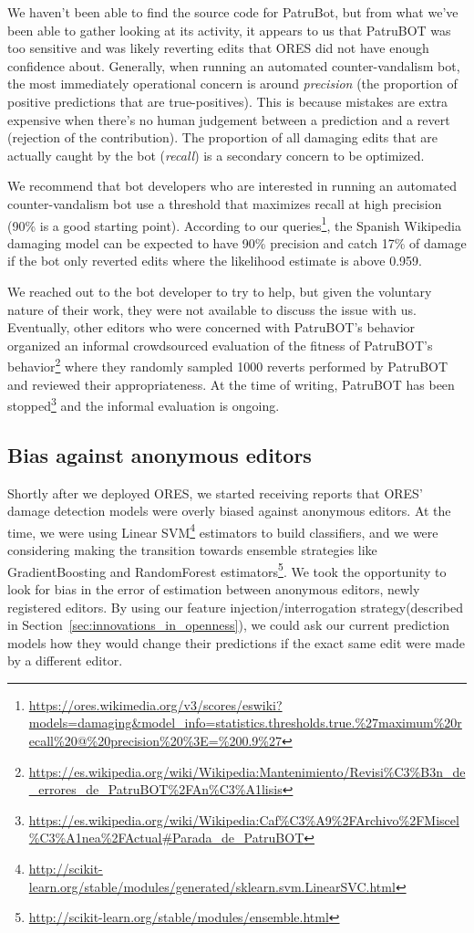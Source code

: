 We haven't been able to find the source code for PatruBot, but from what we've been able to gather looking at its activity, it appears to us that PatruBOT was too sensitive and was likely reverting edits that ORES did not have enough confidence about.  Generally, when running an automated counter-vandalism bot, the most immediately operational concern is around \emph{precision} (the proportion of positive predictions that are true-positives).  This is because mistakes are extra expensive when there's no human judgement between a prediction and a revert (rejection of the contribution).  The proportion of all damaging edits that are actually caught by the bot (\emph{recall}) is a secondary concern to be optimized.

We recommend that bot developers who are interested in running an automated counter-vandalism bot use a threshold that maximizes recall at high precision (90\% is a good starting point).  According to our queries\footnote{\url{https://ores.wikimedia.org/v3/scores/eswiki?models=damaging\&model\_info=statistics.thresholds.true.\%27maximum\%20recall\%20@\%20precision\%20\%3E=\%200.9\%27}}, the Spanish Wikipedia damaging model can be expected to have 90\% precision and catch 17\% of damage if the bot only reverted edits where the likelihood estimate is above 0.959.

We reached out to the bot developer to try to help, but given the voluntary nature of their work, they were not available to discuss the issue with us.  Eventually, other editors who were concerned with PatruBOT's behavior organized an informal crowdsourced evaluation of the fitness of PatruBOT's behavior\footnote{\url{https://es.wikipedia.org/wiki/Wikipedia:Mantenimiento/Revisi\%C3\%B3n\_de\_errores\_de\_PatruBOT\%2FAn\%C3\%A1lisis}} where they randomly sampled 1000 reverts performed by PatruBOT and reviewed their appropriateness. At the time of writing, PatruBOT has been stopped\footnote{\url{https://es.wikipedia.org/wiki/Wikipedia:Caf\%C3\%A9\%2FArchivo\%2FMiscel\%C3\%A1nea\%2FActual\#Parada\_de\_PatruBOT}} and the informal evaluation is ongoing.

\subsection{Bias against anonymous editors}
Shortly after we deployed ORES, we started receiving reports that ORES' damage detection models were overly biased against anonymous editors.  At the time, we were using Linear SVM\footnote{\url{http://scikit-learn.org/stable/modules/generated/sklearn.svm.LinearSVC.html}} estimators to build classifiers, and we were considering making the transition towards ensemble strategies like GradientBoosting and RandomForest estimators\footnote{\url{http://scikit-learn.org/stable/modules/ensemble.html}}.  We took the opportunity to look for bias in the error of estimation between anonymous editors, newly registered editors.  By using our feature injection/interrogation strategy(described in Section~\ref{sec:innovations_in_openness}), we could ask our current prediction models how they would change their predictions if the exact same edit were made by a different editor.

